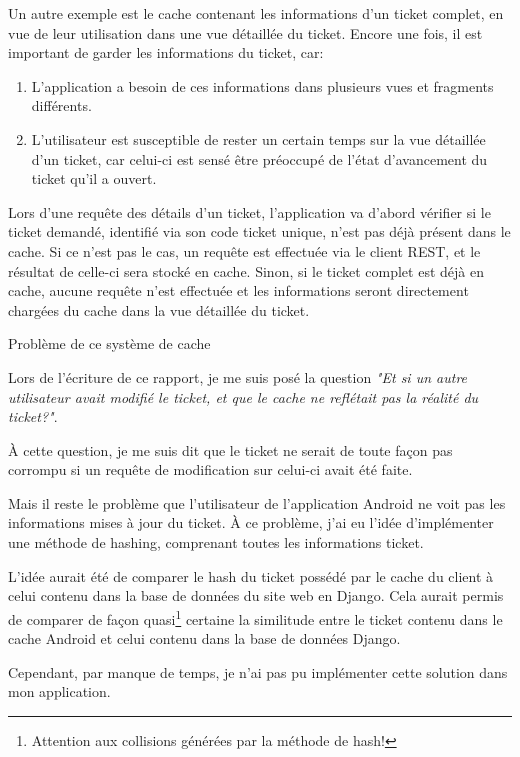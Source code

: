 \documentclass[12pt,table,a4paper]{report}
\begin{document}
Un autre exemple est le cache contenant les informations d'un ticket complet, en vue de leur utilisation dans une vue détaillée du ticket. Encore une fois, il est important de garder les informations du ticket, car:

\begin{enumerate}
\item{L'application a besoin de ces informations dans plusieurs vues et fragments différents.}
\item{L'utilisateur est susceptible de rester un certain temps sur la vue détaillée d'un ticket, car celui-ci est sensé être préoccupé de l'état d'avancement du ticket qu'il a ouvert.}
\end{enumerate}

Lors d'une requête des détails d'un ticket, l'application va d'abord vérifier si le ticket demandé, identifié via son code ticket unique, n'est pas déjà présent dans le cache. Si ce n'est pas le cas, un requête est effectuée via le client REST, et le résultat de celle-ci sera stocké en cache. Sinon, si le ticket complet est déjà en cache, aucune requête n'est effectuée et les informations seront directement chargées du cache dans la vue détaillée du ticket.

\begin{center}
Problème de ce système de cache
\end{center}

Lors de l'écriture de ce rapport, je me suis posé la question \textit{"Et si un autre utilisateur avait modifié le ticket, et que le cache ne reflétait pas la réalité du ticket?"}.

À cette question, je me suis dit que le ticket ne serait de toute façon pas corrompu si un requête de modification sur celui-ci avait été faite.

Mais il reste le problème que l'utilisateur de l'application Android ne voit pas les informations mises à jour du ticket. À ce problème, j'ai eu l'idée d'implémenter une méthode de hashing, comprenant toutes les informations ticket.

L'idée aurait été de comparer le hash du ticket possédé par le cache du client à celui contenu dans la base de données du site web en Django. Cela aurait permis de comparer de façon quasi\footnote{Attention aux collisions générées par la méthode de hash!} certaine la similitude entre le ticket contenu dans le cache Android et celui contenu dans la base de données Django.

Cependant, par manque de temps, je n'ai pas pu implémenter cette solution dans mon application.
\end{document}
